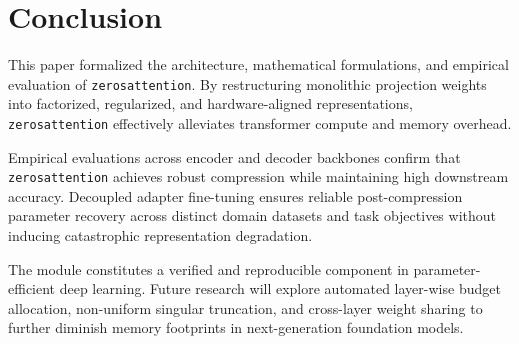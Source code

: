 \section{Conclusion}
This paper formalized the architecture, mathematical formulations, and empirical evaluation of \texttt{zerosattention}. By restructuring monolithic projection weights into factorized, regularized, and hardware-aligned representations, \texttt{zerosattention} effectively alleviates transformer compute and memory overhead.

Empirical evaluations across encoder and decoder backbones confirm that \texttt{zerosattention} achieves robust compression while maintaining high downstream accuracy. Decoupled adapter fine-tuning ensures reliable post-compression parameter recovery across distinct domain datasets and task objectives without inducing catastrophic representation degradation.

The module constitutes a verified and reproducible component in parameter-efficient deep learning. Future research will explore automated layer-wise budget allocation, non-uniform singular truncation, and cross-layer weight sharing to further diminish memory footprints in next-generation foundation models.
